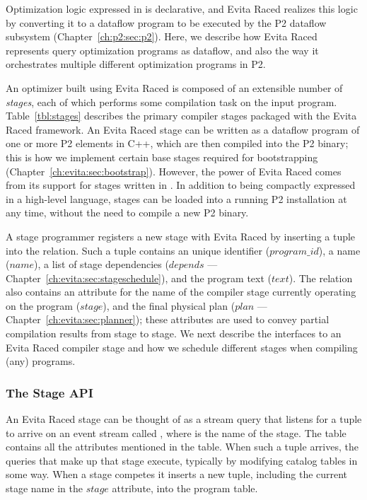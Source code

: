 Optimization logic expressed in \OVERLOG is declarative, and Evita Raced
realizes this logic by converting it to a dataflow program to be executed by
the P2 dataflow subsystem (Chapter~\ref{ch:p2:sec:p2}).  Here, we describe how
Evita Raced represents query optimization programs as dataflow, and also the
way it orchestrates multiple different optimization programs in P2.

An optimizer built using Evita Raced is composed of an extensible number of
{\em stages}, each of which performs some compilation task on the input
program.  Table~\ref{tbl:stages} describes the primary compiler stages packaged
with the Evita Raced framework.  An Evita Raced stage can be written as a
dataflow program of one or more P2 elements in C++, which are then compiled
into the P2 binary; this is how we implement certain base stages required for
bootstrapping (Chapter~\ref{ch:evita:sec:bootstrap}).  However, the power of
Evita Raced comes from its support for stages written in \OVERLOG.  In addition
to being compactly expressed in a high-level language, \OVERLOG stages can be
loaded into a running P2 installation at any time, without the need to compile
a new P2 binary.

A stage programmer registers a new stage with Evita Raced by inserting a tuple
into the  relation.  Such a tuple contains an unique identifier
($program\_id$), a name ($name$), a list of stage dependencies ($depends$ ---
Chapter~\ref{ch:evita:sec:stageschedule}), and the program text ($text$).  The
 relation also contains an attribute for the name of the compiler
stage currently operating on the program ($stage$), and the final physical plan
($plan$ --- Chapter~\ref{ch:evita:sec:planner}); these attributes are used to
convey partial compilation results from stage to stage.  We next describe the
interfaces to an Evita Raced compiler stage and how we schedule different
stages when compiling (any) \OVERLOG programs.

\subsubsection{The Stage API}
\label{ch:evita:sec:stages}

An Evita Raced stage can be thought of as a stream query that listens for a
tuple to arrive on an event stream called , where
 is the name of the stage.  The  table
contains all the attributes mentioned in the  table.  When such a
tuple arrives, the queries that make up that stage execute, typically by
modifying catalog tables in some way.  When a stage competes it inserts a new
 tuple, including the current stage name in the $stage$ attribute,
into the program table.

